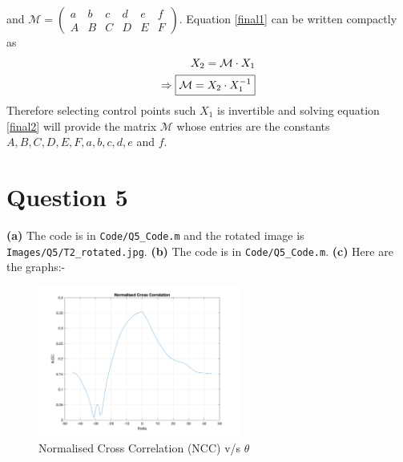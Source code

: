 \documentclass[12pt]{article}
\begin{document}
    and $\mathcal{M} = \begin{pmatrix}
        a & b & c & d & e & f \\
        A & B & C & D & E & F
    \end{pmatrix} $. Equation \ref{final1} can be written compactly as 
    \begin{align}
        X_{2} = \mathcal{M} \cdot X_{1} \nonumber \\
        \Rightarrow \boxed{\label{final2} \mathcal{M} = X_{2} \cdot X_{1}^{-1}} 
    \end{align}
    Therefore selecting control points such $X_{1}$ is invertible and solving equation \ref{final2} will provide the 
    matrix $\mathcal{M}$ whose entries are the constants $A,B,C,D,E,F,a,b,c,d,e$ and $f$.
\section{Question 5}

    \vspace{-10pt}
    
    \textbf{(a)} The code is in \verb|Code/Q5_Code.m| and the rotated image is \verb|Images/Q5/T2_rotated.jpg|. \newline
    \textbf{(b)} The code is in \verb|Code/Q5_Code.m|. \newline
    \textbf{(c)} Here are the graphs:-
    
    \vspace{-13pt}
    
    \begin{figure}[H]
        \centering
        \includegraphics[width=0.59\textwidth]{Images/Q5/NCC.png}
        \vspace{-10pt}
        \caption{Normalised Cross Correlation (NCC) v/s $\theta$}
    \end{figure}
    
    \vspace{-25pt}
    
\end{document}
